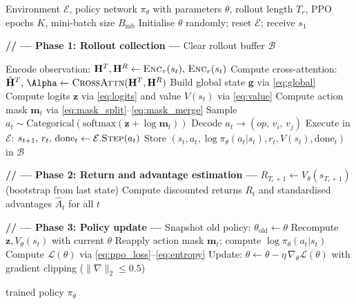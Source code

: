 \begin{algorithm}[t]
\caption{RTGS Training with PPO}
\label{alg:rtgs}
\begin{algorithmic}[1]
\Require Environment $\mathcal{E}$, policy network $\pi_\theta$
         with parameters $\theta$,\;
         rollout length $T_r$,\;
         PPO epochs $K$,\;
         mini-batch size $B_{\mathrm{mb}}$
\State Initialise $\theta$ randomly; reset $\mathcal{E}$; receive $s_1$


  \State \textbf{// --- Phase 1: Rollout collection ---}
  \State Clear rollout buffer $\mathcal{B}$

    \State Encode observation:
           $\mathbf{H}^T, \mathbf{H}^R \leftarrow
            \textsc{Enc}_\tau(s_t),\,\textsc{Enc}_r(s_t)$
    \State Compute cross-attention:
           $\tilde{\mathbf{H}}^T,\, \boldsymbol{\Alpha}
            \leftarrow \textsc{CrossAttn}(\mathbf{H}^T, \mathbf{H}^R)$
    \State Build global state $\mathbf{g}$ via \eqref{eq:global}
    \State Compute logits $\mathbf{z}$ via \eqref{eq:logits}
           and value $V(s_t)$ via \eqref{eq:value}
    \State Compute action mask $\mathbf{m}_t$ via
           \eqref{eq:mask_split}--\eqref{eq:mask_merge}
    \State Sample $a_t \sim \mathrm{Categorical}(
           \mathrm{softmax}(\mathbf{z} + \log\mathbf{m}_t))$
    \State Decode $a_t \rightarrow (op,\, v_i,\, v_j)$
    \State Execute in $\mathcal{E}$:
           $s_{t+1},\, r_t,\, \mathrm{done}_t
            \leftarrow \mathcal{E}.\textsc{Step}(a_t)$
    \State Store $(s_t, a_t, \log\pi_\theta(a_t|s_t),
                  r_t, V(s_t), \mathrm{done}_t)$ in $\mathcal{B}$

  \EndFor

  \State \textbf{// --- Phase 2: Return and advantage estimation ---}
  \State $R_{T_r+1} \leftarrow V_\theta(s_{T_r+1})$
         (bootstrap from last state)
  \State Compute discounted returns $R_t$ and standardised advantages
         $\hat{A}_t$ for all $t$

  \State \textbf{// --- Phase 3: Policy update ---}
  \State Snapshot old policy: $\theta_{\mathrm{old}} \leftarrow \theta$
      \State Recompute $\mathbf{z}, V_\theta(s_t)$ with current $\theta$
      \State Reapply action mask $\mathbf{m}_t$; compute
             $\log\pi_\theta(a_t|s_t)$
      \State Compute $\mathcal{L}(\theta)$ via
             \eqref{eq:ppo_loss}--\eqref{eq:entropy}
      \State Update: $\theta \leftarrow \theta - \eta
             \,\nabla_\theta\mathcal{L}(\theta)$
             with gradient clipping ($\|\nabla\|_2 \leq 0.5$)
    \EndFor
  \EndFor

\EndWhile
\State \Return trained policy $\pi_\theta$
\end{algorithmic}
\end{algorithm}

